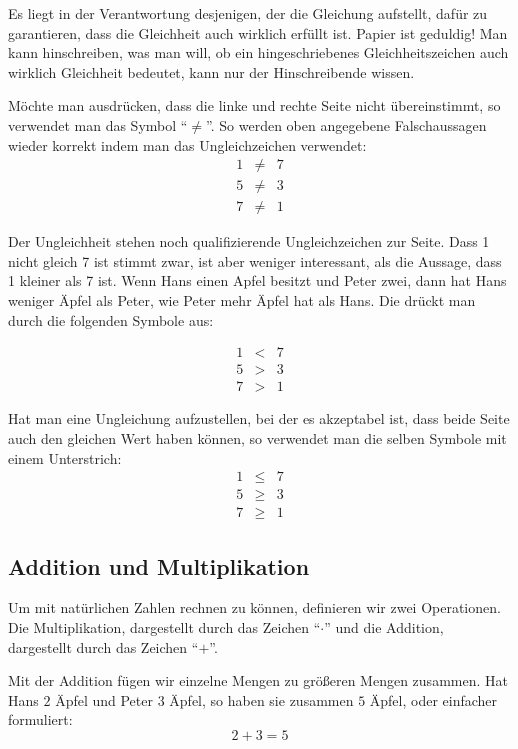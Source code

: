 Es liegt in der Verantwortung desjenigen, der die Gleichung aufstellt, dafür zu garantieren, dass die Gleichheit auch wirklich erfüllt ist. Papier ist geduldig! Man kann hinschreiben, was man will, ob ein hingeschriebenes Gleichheitszeichen auch wirklich Gleichheit bedeutet, kann nur der Hinschreibende wissen.

Möchte man ausdrücken, dass die linke und rechte Seite nicht übereinstimmt, so verwendet man das Symbol "`$\neq $"'. So werden oben angegebene Falschaussagen wieder korrekt indem man das Ungleichzeichen verwendet:
\begin{eqnarray*}
1 &\neq & 7 \\
5 &\neq & 3 \\
7 &\neq & 1
\end{eqnarray*}

Der Ungleichheit stehen noch qualifizierende Ungleichzeichen zur Seite. Dass 1 nicht gleich 7 ist stimmt zwar, ist aber weniger interessant, als die Aussage, dass 1 kleiner als 7 ist. Wenn Hans einen Apfel besitzt und Peter zwei, dann hat Hans weniger Äpfel als Peter, wie Peter mehr Äpfel hat als Hans. Die drückt man durch die folgenden Symbole aus:

\begin{eqnarray*}
1 & < & 7 \\
5 & > & 3 \\
7 & > & 1
\end{eqnarray*}

Hat man eine Ungleichung aufzustellen, bei der es akzeptabel ist, dass beide Seite auch den gleichen Wert haben können, so verwendet man die selben Symbole mit einem Unterstrich:
\begin{eqnarray*}
1 & \le & 7 \\
5 & \ge & 3 \\
7 & \ge & 1
\end{eqnarray*}



\subsection{Addition und Multiplikation}

Um mit natürlichen Zahlen rechnen zu können, definieren wir zwei Operationen. Die Multiplikation, dargestellt durch das Zeichen "`$\cdot$"' und die Addition, dargestellt durch das Zeichen "`$+$"'.

Mit der Addition fügen wir einzelne Mengen zu größeren Mengen zusammen. Hat Hans $2$ Äpfel und Peter $3$ Äpfel, so haben sie zusammen $5$ Äpfel, oder einfacher formuliert:
\[
2+3=5
\]

